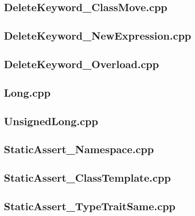 \documentclass[11pt]{report}
\begin{document}
\begin{appendix}
\subsection{DeleteKeyword\_ClassMove.cpp}
\label{DeleteKeyword_ClassMove}


\subsection{DeleteKeyword\_NewExpression.cpp}
\label{DeleteKeyword_NewExpression}


\subsection{DeleteKeyword\_Overload.cpp}
\label{DeleteKeyword_Overload}


\subsection{Long.cpp}
\label{Long}


\subsection{UnsignedLong.cpp}
\label{UnsignedLong}


\subsection{StaticAssert\_Namespace.cpp}
\label{StaticAssert_Namespace}


\subsection{StaticAssert\_ClassTemplate.cpp}
\label{StaticAssert_ClassTemplate}


\subsection{StaticAssert\_TypeTraitSame.cpp}
\label{StaticAssert_TypeTraitSame}



\end{appendix}
\end{document}
